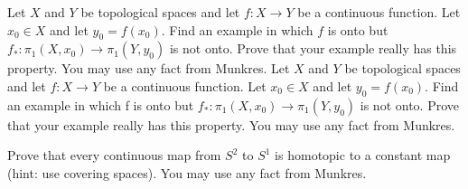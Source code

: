 \begin{problem}
  Let \(X\) and \(Y\) be topological spaces and let \(f\colon X\to Y\) be a
  continuous function. Let \(x_0\in X\) and let \(y_0=f(x_0)\). Find an
  example in which \(f\) is onto but
  \(f_*\colon\pi_1(X,x_0)\to\pi_1(Y,y_0)\) is not onto. Prove that your
  example really has this property. You may use any fact from Munkres. Let
  \(X\) and \(Y\) be topological spaces and let \(f\colon X\to Y\) be a
  continuous function. Let \(x_0\in X\) and let \(y_0=f(x_0)\). Find an
  example in which f is onto but \(f_*\colon\pi_1(X,x_0)\to\pi_1(Y,y_0)\)
  is not onto. Prove that your example really has this property. You may
  use any fact from Munkres.
\end{problem}
\begin{solution}
\end{solution}

\begin{problem}
  Prove that every continuous map from \(S^2\) to \(S^1\) is homotopic to a
  constant map (hint: use covering spaces). You may use any fact from
  Munkres.
\end{problem}
\begin{solution}
\end{solution}

